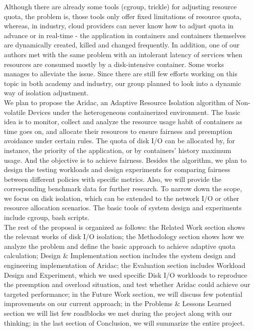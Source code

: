 \documentclass[10pt, conference,compsoc]{IEEEtran}
\begin{document}
Although there are already some tools (cgroup, trickle) for adjusting resource quota, the problem is, those tools only offer fixed limitations of resource quota, whereas, in industry, cloud providers can never know how to adjust quota in advance or in real-time - the application in containers and containers themselves are dynamically created, killed and changed frequently. In addition, one of our authors met with the same problem with an intolerant latency of services when resources are consumed mostly by a disk-intensive container. Some works \cite{Sungyong16} manages to alleviate the issue. Since there are still few efforts working on this topic in both academy and industry, our group planned to look into a dynamic way of isolation adjustment.\\

We plan to propose the Aridac, an Adaptive Resource Isolation algorithm of Non-volatile Devices under the heterogeneous containerized environment. The basic idea is to monitor, collect and analyze the resource usage habit of containers as time goes on, and allocate their resources to ensure fairness and preemption avoidance under certain rules. The quota of disk I/O can be allocated by, for instance, the priority of the application, or by containers' history maximum usage. And the objective is to achieve fairness. Besides the algorithm, we plan to design the testing workloads and design experiments for comparing fairness between different policies with specific metrics. Also, we will provide the corresponding benchmark data for further research. To narrow down the scope, we focus on disk isolation, which can be extended to the network I/O or other resource allocation scenarios. The basic tools of system design and experiments include cgroup, bash scripts.\\

The rest of the proposal is organized as follows: the Related Work section shows the relevant works of disk I/O isolation; the Methodology section shows how we analyze the problem and define the basic approach to achieve adaptive quota calculation; Design \& Implementation section includes the system design and engineering implementation of Aridac; the Evaluation section includes Workload Design and Experiment, which we used specific Disk I/O workloads to reproduce the preemption and overload situation, and test whether Aridac could achieve our targeted performance; in the Future Work section, we will discuss few potential improvements on our current approach; in the Problems \& Lessons Learned section we will list few roadblocks we met during the project along with our thinking; in the last section of Conclusion, we will summarize the entire project. \\
\end{document}
